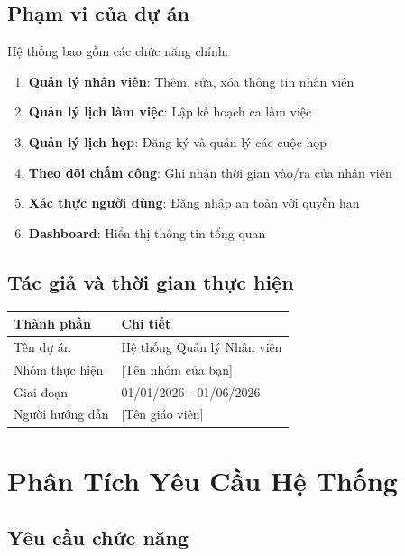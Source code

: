 \documentclass[12pt,a4paper]{report}
\begin{document}
\subsection{Phạm vi của dự án}

Hệ thống bao gồm các chức năng chính:
\begin{enumerate}
    \item \textbf{Quản lý nhân viên}: Thêm, sửa, xóa thông tin nhân viên
    \item \textbf{Quản lý lịch làm việc}: Lập kế hoạch ca làm việc
    \item \textbf{Quản lý lịch họp}: Đăng ký và quản lý các cuộc họp
    \item \textbf{Theo dõi chấm công}: Ghi nhận thời gian vào/ra của nhân viên
    \item \textbf{Xác thực người dùng}: Đăng nhập an toàn với quyền hạn
    \item \textbf{Dashboard}: Hiển thị thông tin tổng quan
\end{enumerate}

\subsection{Tác giả và thời gian thực hiện}

\begin{table}[H]
    \centering
    \begin{tabular}{ll}
        \toprule
        \textbf{Thành phần} & \textbf{Chi tiết} \\
        \midrule
        Tên dự án & Hệ thống Quản lý Nhân viên \\
        Nhóm thực hiện & [Tên nhóm của bạn] \\
        Giai đoạn & 01/01/2026 - 01/06/2026 \\
        Người hướng dẫn & [Tên giáo viên] \\
        \bottomrule
    \end{tabular}
\end{table}

\newpage

\section{Phân Tích Yêu Cầu Hệ Thống}

\subsection{Yêu cầu chức năng}
\end{document}
